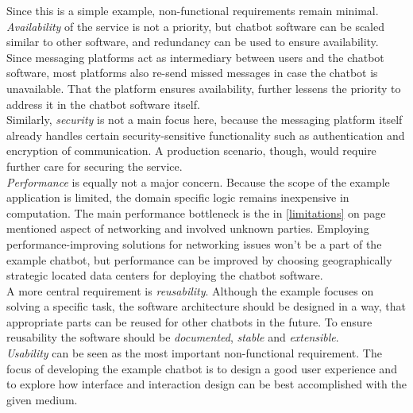 Since this is a simple example, non-functional requirements remain minimal.
\\
\emph{Availability} of the service is not a priority, but chatbot software can be scaled similar to other software,
and redundancy can be used to ensure availability.
Since messaging platforms act as intermediary between users and the chatbot software, most platforms also re-send missed messages in case the chatbot is unavailable.
That the platform ensures availability, further lessens the priority to address it in the chatbot software itself.
\\
Similarly, \emph{security} is not a main focus here, because the messaging platform itself already handles certain security-sensitive functionality such as authentication and encryption of communication. A production scenario, though, would require further care for securing the service.
\\
\emph{Performance} is equally not a major concern.
Because the scope of the example application is limited,
the domain specific logic remains inexpensive in computation.
The main performance bottleneck is the in \ref{limitations} on page \pageref{limitations} mentioned aspect of networking and involved unknown parties.
Employing performance-improving solutions for networking issues won't be a part of the example chatbot,
but performance can be improved by choosing geographically strategic located data centers for deploying the chatbot software.
\\
A more central requirement is \emph{reusability}.
Although the example focuses on solving a specific task,
the software architecture should be designed in a way,
that appropriate parts can be reused for other chatbots in the future.
To ensure reusability the software should be \emph{documented}, \emph{stable} and \emph{extensible}.
\\
\emph{Usability} can be seen as the most important non-functional requirement.
The focus of developing the example chatbot is to design a good user experience and to explore how interface and interaction design can be best accomplished with the given medium.
